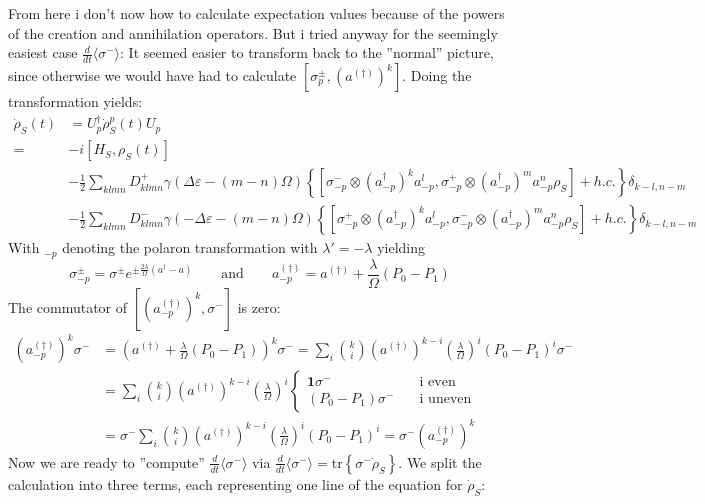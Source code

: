 	From here i don't now how to calculate expectation values because of the powers of the creation and annihilation operators. But i tried anyway for the seemingly easiest case $\frac{d}{dt} {\langle \sigma^- \rangle}$:
	It seemed easier to transform back to the ''normal'' picture, since otherwise we would have had to calculate $[\sigma_p^\pm, (a^{(\dagger)})^k]$. Doing the transformation yields:
	\begin{align*}
		\dot{\rho}_S(t) &=	U_p^\dagger \dot{\rho}_S^p(t) U_p \\
		=&-i \left[H_S,  {\rho}_S(t)\right] \\
		&- \frac{1}{2} \sum_{klmn}^{}  D_{klmn}^+ \gamma(\Delta \varepsilon - (m-n) \Omega) \left\{ \left[\sigma^-_{-p} \otimes (a^\dagger_{-p})^k a^l_{-p}, \sigma^+_{-p} \otimes (a^\dagger_{-p})^m a^n_{-p} {\rho}_S\right] + h.c. \right\} \delta_{k-l, n-m} \\
		&-\frac{1}{2} \sum_{klmn}^{}  D_{klmn}^- \gamma(- \Delta \varepsilon - (m-n) \Omega) \left\{ \left[\sigma^+_{-p} \otimes (a^\dagger_{-p})^k a^l_{-p}, \sigma^-_{-p} \otimes (a^\dagger_{-p})^m a^n_{-p} {\rho}_S\right] + h.c. \right\} \delta_{k-l, n-m}
	\end{align*}
	With $_{-p}$ denoting the polaron transformation with $\lambda' =	-\lambda $ yielding
	\begin{equation}
		\sigma^\pm_{-p} =	\sigma^\pm e^{\pm \frac{2\lambda}{\Omega} (a^\dagger -a)} \qquad \text{and} \qquad a^{(\dagger)}_{-p} =	a^{(\dagger)} + \frac{\lambda}{\Omega}(P_0 - P_1)
	\end{equation}
	The commutator of $[(a^{(\dagger)}_{-p})^k, \sigma^-]$ is zero:
	\begin{align*}
		(a^{(\dagger)}_{-p})^k \sigma^- &=	(a^{(\dagger)} + \frac{\lambda}{\Omega}(P_0 - P_1))^k \sigma^- =	\sum_i \binom{k}{i} (a^{(\dagger)})^{k-i} \left(\frac{\lambda}{\Omega}\right)^i (P_0 - P_1)^i \sigma^- \\
		&= \sum_i \binom{k}{i} (a^{(\dagger)})^{k-i} \left(\frac{\lambda}{\Omega}\right)^i \begin{cases}
			\mathbf{1} \sigma^- &\quad \text{i even} \\
			(P_0 - P_1) \sigma^- &\quad \text{i uneven}
		\end{cases} \\
		&= \sigma^- \sum_i \binom{k}{i} (a^{(\dagger)})^{k-i} \left(\frac{\lambda}{\Omega}\right)^i (P_0 - P_1)^i =	\sigma^- (a^{(\dagger)}_{-p})^k
	\end{align*}
	Now we are ready to ''compute''	$\frac{d}{dt} {\langle \sigma^- \rangle}$ via $ \frac{d}{dt} {\langle \sigma^- \rangle} =	\text{tr}\left\{\sigma^- \dot{\rho}_S\right\}$. We split the calculation into three terms, each representing one line of the equation for $\dot{\rho}_S$:
